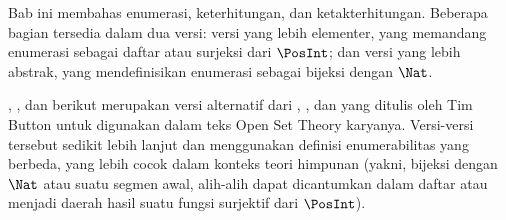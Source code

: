 \documentclass[../../../include/open-logic-chapter]{subfiles}
\begin{document}

\begin{editorial}
Bab ini membahas enumerasi, keterhitungan, dan ketakterhitungan.
Beberapa bagian tersedia dalam dua versi: versi yang lebih elementer,
yang memandang enumerasi sebagai daftar atau surjeksi dari $\PosInt$; dan
versi yang lebih abstrak, yang mendefinisikan enumerasi sebagai bijeksi
dengan $\Nat$.
\end{editorial}











\begin{editorial}
,
, dan 
berikut merupakan versi alternatif dari ,
, dan  yang ditulis
oleh Tim Button untuk digunakan dalam teks Open Set Theory karyanya.
Versi-versi tersebut sedikit lebih lanjut dan menggunakan definisi
enumerabilitas yang berbeda, yang lebih cocok dalam konteks teori himpunan
(yakni, bijeksi dengan $\Nat$ atau suatu segmen awal, alih-alih dapat
dicantumkan dalam daftar atau menjadi daerah hasil suatu fungsi surjektif
dari $\PosInt$).
\end{editorial}


\OLEndChapterHook
\end{document}
